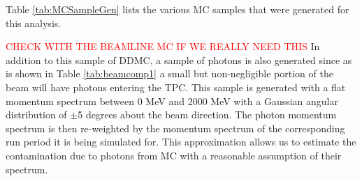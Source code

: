 Table \ref{tab:MCSampleGen} lists the various MC samples that were generated for this analysis. 

\begin{table}[htb]
	\begin{center}
	\caption{Summary of MC generated for the analysis.} \label{tab:MCSampleGen}
	\end{center}
\end{table}

\textcolor{red}{CHECK WITH THE BEAMLINE MC IF WE REALLY NEED THIS}
In addition to this sample of DDMC, a sample of photons is also generated since as is shown in Table \ref{tab:beamcomp1} a small but non-negligible portion of the beam will have photons entering the TPC. This sample is generated with a flat momentum spectrum between 0 MeV and 2000 MeV with a Gaussian angular distribution of $\pm$5 degrees about the beam direction. The photon momentum spectrum is then re-weighted by the momentum spectrum of the corresponding run period it is being simulated for. This approximation allows us to estimate the contamination due to photons from MC with a reasonable assumption of their spectrum.


